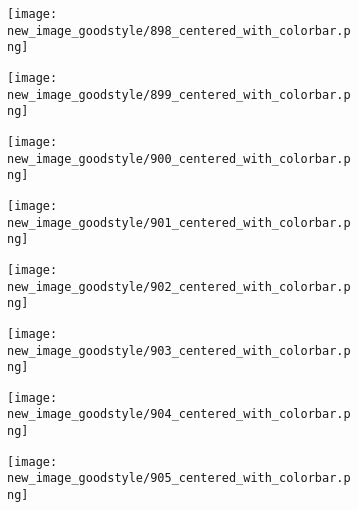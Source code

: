 \documentclass[a4paper,12pt]{article}
\begin{document}
\begin{figure}[H]
  \begin{subfigure}{0.11\textwidth}
    \texttt{[image: new\_image\_goodstyle/898\_centered\_with\_colorbar.png]}
  \end{subfigure}
  \hfill
  \begin{subfigure}{0.11\textwidth}
    \texttt{[image: new\_image\_goodstyle/899\_centered\_with\_colorbar.png]}
  \end{subfigure}
  \hfill
  \begin{subfigure}{0.11\textwidth}
    \texttt{[image: new\_image\_goodstyle/900\_centered\_with\_colorbar.png]}
  \end{subfigure}
  \hfill
  \begin{subfigure}{0.11\textwidth}
    \texttt{[image: new\_image\_goodstyle/901\_centered\_with\_colorbar.png]}
  \end{subfigure}
  \hfill
  \begin{subfigure}{0.11\textwidth}
    \texttt{[image: new\_image\_goodstyle/902\_centered\_with\_colorbar.png]}
  \end{subfigure}
  \hfill
  \begin{subfigure}{0.11\textwidth}
    \texttt{[image: new\_image\_goodstyle/903\_centered\_with\_colorbar.png]}
  \end{subfigure}
  \hfill
  \begin{subfigure}{0.11\textwidth}
    \texttt{[image: new\_image\_goodstyle/904\_centered\_with\_colorbar.png]}
  \end{subfigure}
  \hfill
  \begin{subfigure}{0.11\textwidth}
    \texttt{[image: new\_image\_goodstyle/905\_centered\_with\_colorbar.png]}
  \end{subfigure}
  \hfill
\end{figure}
\end{document}
